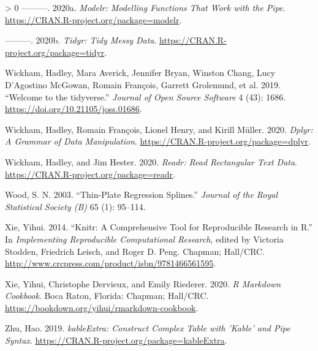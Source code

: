 \documentclass{article}
\newlength{\cslhangindent}
\newenvironment{CSLReferences}[3] %
 {%
  \setlength{\parindent}{0pt}
  \ifodd #1 \everypar{\setlength{\hangindent}{\cslhangindent}}\ignorespaces\fi
  \ifnum #2 > 0
  \setlength{\parskip}{#2\baselineskip}
  \fi
 }%
 {}
\begin{document}
\begin{CSLReferences}{1}{0}
\leavevmode\hypertarget{ref-modelr}{}%
---------. 2020a. \emph{Modelr: Modelling Functions That Work with the Pipe}. \url{https://CRAN.R-project.org/package=modelr}.

\leavevmode\hypertarget{ref-tidyr}{}%
---------. 2020b. \emph{Tidyr: Tidy Messy Data}. \url{https://CRAN.R-project.org/package=tidyr}.

\leavevmode\hypertarget{ref-tidyverse}{}%
Wickham, Hadley, Mara Averick, Jennifer Bryan, Winston Chang, Lucy D'Agostino McGowan, Romain François, Garrett Grolemund, et al. 2019. {``Welcome to the {tidyverse}.''} \emph{Journal of Open Source Software} 4 (43): 1686. \url{https://doi.org/10.21105/joss.01686}.

\leavevmode\hypertarget{ref-dplyr}{}%
Wickham, Hadley, Romain François, Lionel Henry, and Kirill Müller. 2020. \emph{Dplyr: A Grammar of Data Manipulation}. \url{https://CRAN.R-project.org/package=dplyr}.

\leavevmode\hypertarget{ref-readr}{}%
Wickham, Hadley, and Jim Hester. 2020. \emph{Readr: Read Rectangular Text Data}. \url{https://CRAN.R-project.org/package=readr}.

\leavevmode\hypertarget{ref-mgcv}{}%
Wood, S. N. 2003. {``Thin-Plate Regression Splines.''} \emph{Journal of the Royal Statistical Society (B)} 65 (1): 95--114.

\leavevmode\hypertarget{ref-knitr}{}%
Xie, Yihui. 2014. {``Knitr: A Comprehensive Tool for Reproducible Research in {R}.''} In \emph{Implementing Reproducible Computational Research}, edited by Victoria Stodden, Friedrich Leisch, and Roger D. Peng. Chapman; Hall/CRC. \url{http://www.crcpress.com/product/isbn/9781466561595}.

\leavevmode\hypertarget{ref-rmarkdown}{}%
Xie, Yihui, Christophe Dervieux, and Emily Riederer. 2020. \emph{R Markdown Cookbook}. Boca Raton, Florida: Chapman; Hall/CRC. \url{https://bookdown.org/yihui/rmarkdown-cookbook}.

\leavevmode\hypertarget{ref-kableExtra}{}%
Zhu, Hao. 2019. \emph{kableExtra: Construct Complex Table with 'Kable' and Pipe Syntax}. \url{https://CRAN.R-project.org/package=kableExtra}.

\end{CSLReferences}



\end{document}
